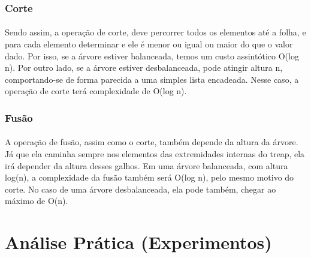 \documentclass[a4paper, 12pt]{article}
\begin{document}
\subsubsection{Corte}
\paragraph{}
Sendo assim, a operação de corte, deve percorrer todos os elementos até a folha, e para cada elemento determinar e ele é menor ou igual ou maior do que o valor dado. Por isso, se a árvore estiver balanceada, temos um custo assintótico O(log n). Por outro lado, se a árvore estiver desbalanceada, pode atingir altura n, comportando-se de forma parecida a uma simples lista encadeada. Nesse caso, a operação de corte terá complexidade de O(log n).
\subsubsection{Fusão}
\paragraph{}
A operação de fusão, assim como o corte, também depende da altura da árvore. Já que ela caminha sempre nos elementos das extremidades internas do treap, ela irá depender da altura desses galhos. Em uma árvore balanceada, com altura log(n), a complexidade da fusão também será O(log n), pelo mesmo motivo do corte. No caso de uma árvore desbalanceada, ela pode também, chegar ao máximo de O(n).


\section{Análise Prática (Experimentos)}
\end{document}
